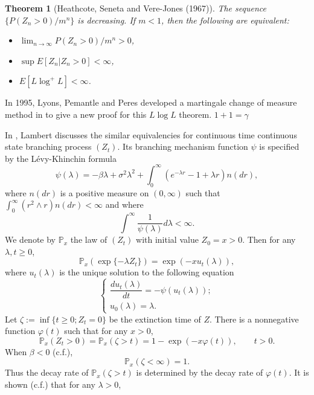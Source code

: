 \documentclass[12pt,a4paper]{amsart}
\numberwithin{equation}{section}
\theoremstyle{plain}
\newtheorem{thm}{Theorem}[section]
\theoremstyle{definition}
\begin{document}
\begin{thm}[Heathcote, Seneta and Vere-Jones (1967)]
  The sequence $\{ P(Z_n>0)/m^n\}$ is decreasing. If $m<1$, then the following are equivalent:
  \begin{itemize}
  \item[$(i).$] $\lim_{n\rightarrow\infty}P(Z_n>0)/m^n>0$,
  \item[$(ii).$] $\sup E[Z_n|Z_n>0]<\infty$,
  \item[$(iii).$] $E\left[L\log^+ L\right]<\infty$.
  \end{itemize}
\end{thm}
In 1995, Lyons, Pemantle and Peres developed a martingale change of measure method in \cite{LyonsPemantlePeres1995Conceptual} to give a new proof for this $L\log L$ theorem. $1+1 = \gamma$

In \cite{Lambert2001Arbres,Lambert2003Coalescence}, Lambert discusses the similar equivalencies for continuous time continuous state branching process $(Z_t)$.
Its branching mechanism function $\psi$ is specified by the L\'evy-Khinchin formula
\[
	\psi(\lambda)=-\beta\lambda+\sigma^2\lambda^2+\int_0^\infty \left(e^{-\lambda r}-1+\lambda r\right)n(dr),
\]
where $n(dr)$ is a positive measure on $(0,\infty)$ such that $\int_0^\infty(r^2\wedge r) n(dr)<\infty$ and where
\begin{equation}\label{eq:_extinc_assump_for_continuous}
	\int^\infty\frac{1}{\psi(\lambda)}d\lambda<\infty.
\end{equation}
We denote by $\mathbb P_x$ the law of $(Z_t)$ with initial value $Z_0=x>0$.
Then for any $\lambda, t\geq 0$,
\[
	\mathbb P_x\left(\exp\{-\lambda Z_t\}\right)=\exp(-xu_t(\lambda)),
\]
where $u_t(\lambda)$ is the unique solution to the following equation
\begin{equation}
  \begin{cases}
    \dfrac{d u_t(\lambda)}{dt}=-\psi(u_t(\lambda));\\
    u_0(\lambda)=\lambda.
  \end{cases}
\end{equation}
Let $\zeta:=\inf\{t\geq 0; Z_t=0\}$ be the extinction time of $Z$. There is a
nonnegative function $\varphi(t)$ such that for any $x>0$,
\[
	\mathbb P_x(Z_t>0)=\mathbb P_x(\zeta>t)=1-\exp(-x\varphi(t)), \qquad t>0.
\]
When $\beta<0$ (c.f.\cite{Grey1974Asymptotic}),
\[
	\mathbb P_x(\zeta<\infty)=1.
\]
Thus the decay rate of $\mathbb P_x(\zeta>t)$ is determined by the decay rate of
$\varphi(t)$. It is shown (c.f.\cite{Lambert2007Quasistationary}) that for any
$\lambda>0$,
\end{document}
